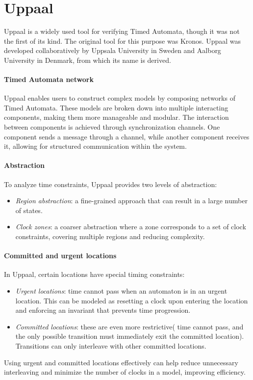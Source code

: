 \section{Uppaal}

Uppaal is a widely used tool for verifying Timed Automata, though it was not the first of its kind. 
The original tool for this purpose was Kronos.
Uppaal was developed collaboratively by Uppsala University in Sweden and Aalborg University in Denmark, from which its name is derived. 

\paragraph*{Timed Automata network}
Uppaal enables users to construct complex models by composing networks of Timed Automata. 
These models are broken down into multiple interacting components, making them more manageable and modular.
The interaction between components is achieved through synchronization channels. 
One component sends a message through a channel, while another component receives it, allowing for structured communication within the system.

\paragraph*{Abstraction}
To analyze time constraints, Uppaal provides two levels of abstraction:
\begin{itemize}
    \item \textit{Region abstraction}: a fine-grained approach that can result in a large number of states.
    \item \textit{Clock zones}: a coarser abstraction where a zone corresponds to a set of clock constraints, covering multiple regions and reducing complexity.
\end{itemize}

\paragraph*{Committed and urgent locations}
In Uppaal, certain locations have special timing constraints:
\begin{itemize}
    \item \textit{Urgent locations}: time cannot pass when an automaton is in an urgent location. 
        This can be modeled as resetting a clock upon entering the location and enforcing an invariant that prevents time progression.
    \item \textit{Committed locations}: these are even more restrictive( time cannot pass, and the only possible transition must immediately exit the committed location). 
        Transitions can only interleave with other committed locations.
\end{itemize}
\noindent Using urgent and committed locations effectively can help reduce unnecessary interleaving and minimize the number of clocks in a model, improving efficiency.

